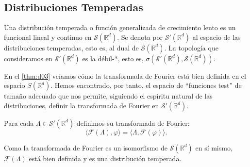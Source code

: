 \subsection{Distribuciones Temperadas}
\begin{definicion}
Una distribución temperada o función generalizada de crecimiento lento es un funcional lineal y continuo en $\mathcal{S}(\mathds{R}^{d})$. Se denota por $\mathcal{S'}(\mathds{R}^{d})$ al espacio de las distribuciones temperadas, esto es, al dual de $\mathcal{S}(\mathds{R}^{d})$. La topología que consideramos en $\mathcal{S'}(\mathds{R}^{d})$                   es la débil-*, esto es, $\sigma(\mathcal{S'}(\mathds{R}^{d}),\mathcal{S}(\mathds{R}^{d}))$.
\end{definicion}

En el \autoref{thm:d03} veíamos cómo la transformada de Fourier está bien definida en el espacio $S(\mathds{R}^{d})$. Hemos encontrado, por tanto, el espacio de ``funciones test'' de tamaño adecuado que nos permite, siguiendo el espíritu natural de las distribuciones, definir la transformada de Fourier en $ \mathcal{S'}(\mathds{R}^{d})$. 

\begin{definicion}
Para cada $\Lambda\in \mathcal{S'}(\mathds{R}^{d})$ definimos su transformada de Fourier:
\begin{equation}
\langle \mathcal{F}(\Lambda), \varphi\rangle = \langle \Lambda, \mathcal{F}(\varphi) \rangle.
\end{equation}
\end{definicion}

Como la transformada de Fourier es un isomorfismo de $\mathcal{S}(\mathds{R}^{d})$ en sí mismo, $\mathcal{F}(\Lambda)$ está bien definida y es una distribución temperada. 

